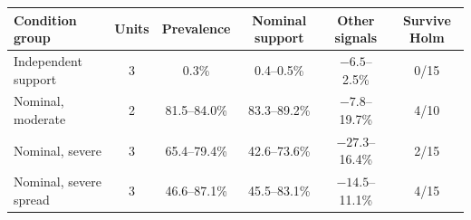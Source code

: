 \begin{tabular}{@{}l c c c c c@{}}
\toprule
Condition group & Units & Prevalence & Nominal support & Other signals & Survive Holm \\
\midrule
Independent support & 3 & \num{0.3}\% & \num{0.4}--\num{0.5}\% & $-\num{6.5}$--\num{2.5}\% & 0/15 \\
Nominal, moderate & 2 & \num{81.5}--\num{84.0}\% & \num{83.3}--\num{89.2}\% & $-\num{7.8}$--\num{19.7}\% & 4/10 \\
Nominal, severe & 3 & \num{65.4}--\num{79.4}\% & \num{42.6}--\num{73.6}\% & $-\num{27.3}$--\num{16.4}\% & 2/15 \\
Nominal, severe spread & 3 & \num{46.6}--\num{87.1}\% & \num{45.5}--\num{83.1}\% & $-\num{14.5}$--\num{11.1}\% & 4/15 \\
\bottomrule
\end{tabular}
